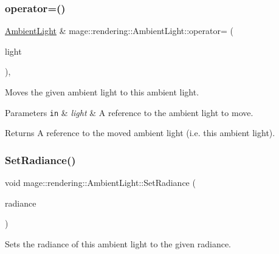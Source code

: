 \subsubsection{\texorpdfstring{operator=()}{operator=()}\hspace{0.1cm}{\footnotesize\ttfamily [2/2]}}
{\footnotesize\ttfamily \mbox{\hyperlink{classmage_1_1rendering_1_1_ambient_light}{Ambient\+Light}} \& mage\+::rendering\+::\+Ambient\+Light\+::operator= (\begin{DoxyParamCaption}\item[{\mbox{\hyperlink{classmage_1_1rendering_1_1_ambient_light}{Ambient\+Light}} \&\&}]{light }\end{DoxyParamCaption})\hspace{0.3cm}{\ttfamily [default]}, {\ttfamily [noexcept]}}

Moves the given ambient light to this ambient light.


\begin{DoxyParams}[1]{Parameters}
\mbox{\tt in}  & {\em light} & A reference to the ambient light to move. \\
\hline
\end{DoxyParams}
\begin{DoxyReturn}{Returns}
A reference to the moved ambient light (i.\+e. this ambient light). 
\end{DoxyReturn}
\mbox{\label{classmage_1_1rendering_1_1_ambient_light_a2da2e614906dc166121a0d0d391b9fc2}} 
\subsubsection{\texorpdfstring{Set\+Radiance()}{SetRadiance()}}
{\footnotesize\ttfamily void mage\+::rendering\+::\+Ambient\+Light\+::\+Set\+Radiance (\begin{DoxyParamCaption}\item[{\mbox{\hyperlink{namespacemage_aa97e833b45f06d60a0a9c4fc22ae02c0}{F32}}}]{radiance }\end{DoxyParamCaption})\hspace{0.3cm}{\ttfamily [noexcept]}}

Sets the radiance of this ambient light to the given radiance.


